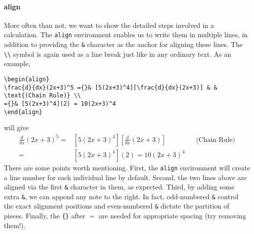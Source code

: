 \paragraph{align}
More often than not, we want to show the detailed steps involved in a calculation. The \texttt{align} environment enables us to write them in multiple lines, in addition to providing the \texttt{\&} character as the anchor for aligning these lines. The \texttt{\textbackslash\textbackslash} symbol is again used as a line break just like in any ordinary text. As an example,
\begin{lstlisting}
\begin{align}
\frac{d}{dx}(2x+3)^5 ={}& [5(2x+3)^4][\frac{d}{dx}(2x+3)] & & \text{(Chain Rule)} \\
={}& [5(2x+3)^4](2) = 10(2x+3)^4
\end{align}
\end{lstlisting}
will give
\begin{align}
\frac{d}{dx}(2x+3)^5 ={}& [5(2x+3)^4][\frac{d}{dx}(2x+3)] & & \text{(Chain Rule)} \\
={}& [5(2x+3)^4](2) = 10(2x+3)^4
\end{align}
There are some points worth mentioning. First, the \texttt{align} environment will create a line number for each individual line by default. Second, the two lines above are aligned via the first \texttt{\&} character in them, as expected. Third, by adding some extra \texttt{\&}, we can append any note to the right. In fact, odd-numbered \texttt{\&} control the exact alignment positions and even-numbered \texttt{\&} dictate the partition of pieces. Finally, the \texttt{\{\}} after $=$ are needed for appropriate spacing (try removing them!).

